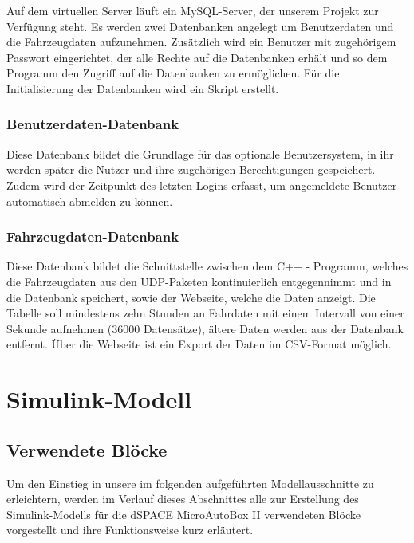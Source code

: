 \documentclass[fontsize = 12pt, paper = a4]{scrreprt}
\begin{document}
Auf dem virtuellen Server läuft ein MySQL-Server, der unserem Projekt zur Verfügung steht. Es werden zwei Datenbanken angelegt um Benutzerdaten und die Fahrzeugdaten aufzunehmen. Zusätzlich wird ein Benutzer mit zugehörigem Passwort eingerichtet, der alle Rechte auf die Datenbanken erhält und so dem Programm den Zugriff auf die Datenbanken zu ermöglichen. Für die Initialisierung der Datenbanken wird ein Skript erstellt.

\subsubsection{Benutzerdaten-Datenbank}

Diese Datenbank bildet die Grundlage für das optionale Benutzersystem, in ihr werden später die Nutzer und ihre zugehörigen Berechtigungen gespeichert. Zudem wird der Zeitpunkt des letzten Logins erfasst, um angemeldete Benutzer automatisch abmelden zu können.

\subsubsection{Fahrzeugdaten-Datenbank}

Diese Datenbank bildet die Schnittstelle zwischen dem C++ - Programm, welches die Fahrzeugdaten aus den UDP-Paketen kontinuierlich entgegennimmt und in die Datenbank speichert, sowie der Webseite, welche die Daten anzeigt. Die Tabelle soll mindestens zehn Stunden an Fahrdaten mit einem Intervall von einer Sekunde aufnehmen (36000 Datensätze), ältere Daten werden aus der Datenbank entfernt. Über die Webseite ist ein Export der Daten im CSV-Format möglich. 



\section{Simulink-Modell}
\subsection{Verwendete Blöcke}

Um den Einstieg in unsere im folgenden aufgeführten Modellausschnitte  zu erleichtern, werden im Verlauf dieses Abschnittes alle zur Erstellung des Simulink-Modells für die dSPACE MicroAutoBox II verwendeten Blöcke vorgestellt und ihre Funktionsweise kurz erläutert. 
\end{document}
